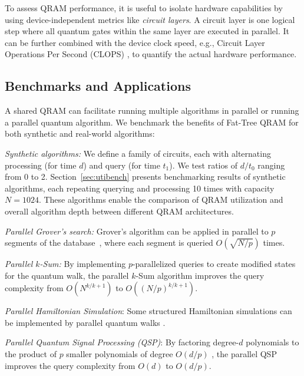 To assess QRAM performance, it is useful to isolate hardware capabilities by using device-independent metrics like \emph{circuit layers}. A circuit layer is one logical step where all quantum gates within the same layer are executed in parallel. It can be further combined with the device clock speed, e.g., Circuit Layer Operations Per Second (CLOPS) \cite{amico2023defining}, to quantify the actual hardware performance.

\subsection{Benchmarks and Applications}
A shared QRAM can facilitate running multiple algorithms in parallel or running a parallel quantum algorithm. We benchmark the benefits of Fat-Tree QRAM for both synthetic and real-world algorithms:

\emph{Synthetic algorithms:} We define a family of circuits, each with alternating processing (for time $d$) and query (for time $t_1$). We test ratios of $d/t_0$ ranging from 0 to 2. Section~\ref{sec:utibench} presents benchmarking results of synthetic algorithms, each repeating querying and processing 10 times with capacity $N = 1024$. These algorithms enable the comparison of QRAM utilization and overall algorithm depth between different QRAM architectures.

\emph{Parallel Grover’s search:} Grover's algorithm can be  applied in parallel to $p$ segments of the database~\cite{zalka1999grover}, where each segment is queried $O\left(\sqrt{N/p}\right)$ times.

    
\emph{Parallel $k$-Sum:} By implementing $p$-parallelized queries to create modified states for the quantum walk, the parallel $k$-Sum algorithm improves the query complexity from $O(N^{k/k+1})$ to $O({(N/p)}^{k/k+1})$.

\emph{Parallel Hamiltonian Simulation}: Some structured Hamiltonian simulations can be implemented by parallel quantum walks \cite{zhang2024parallel}.

\emph{Parallel Quantum Signal Processing (QSP)}: By factoring degree-$d$ polynomials to the product of $p$ smaller polynomials of degree $O(d/p)$ \cite{martyn2024parallel}, the parallel QSP improves the query complexity from $O(d)$ to $O(d/p)$.
